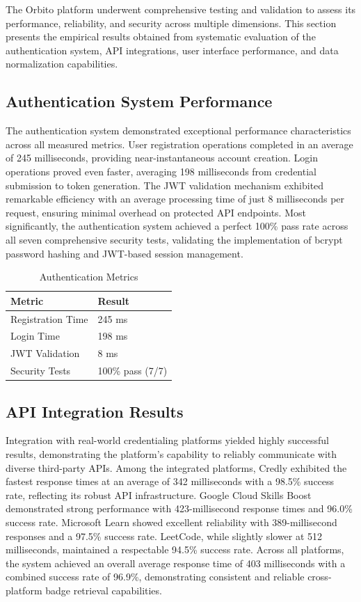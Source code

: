 \documentclass[12pt,a4paper]{article}
\begin{document}
The Orbito platform underwent comprehensive testing and validation to assess its performance, reliability, and security across multiple dimensions. This section presents the empirical results obtained from systematic evaluation of the authentication system, API integrations, user interface performance, and data normalization capabilities.

\subsection{Authentication System Performance}

The authentication system demonstrated exceptional performance characteristics across all measured metrics. User registration operations completed in an average of 245 milliseconds, providing near-instantaneous account creation. Login operations proved even faster, averaging 198 milliseconds from credential submission to token generation. The JWT validation mechanism exhibited remarkable efficiency with an average processing time of just 8 milliseconds per request, ensuring minimal overhead on protected API endpoints. Most significantly, the authentication system achieved a perfect 100\% pass rate across all seven comprehensive security tests, validating the implementation of bcrypt password hashing and JWT-based session management.

\begin{table}[H]
\centering
\caption{Authentication Metrics}
\begin{tabular}{@{}ll@{}}
\toprule
\textbf{Metric} & \textbf{Result} \\
\midrule
Registration Time & 245 ms \\
Login Time & 198 ms \\
JWT Validation & 8 ms \\
Security Tests & 100\% pass (7/7) \\
\bottomrule
\end{tabular}
\end{table}

\subsection{API Integration Results}

Integration with real-world credentialing platforms yielded highly successful results, demonstrating the platform's capability to reliably communicate with diverse third-party APIs. Among the integrated platforms, Credly exhibited the fastest response times at an average of 342 milliseconds with a 98.5\% success rate, reflecting its robust API infrastructure. Google Cloud Skills Boost demonstrated strong performance with 423-millisecond response times and 96.0\% success rate. Microsoft Learn showed excellent reliability with 389-millisecond responses and a 97.5\% success rate. LeetCode, while slightly slower at 512 milliseconds, maintained a respectable 94.5\% success rate. Across all platforms, the system achieved an overall average response time of 403 milliseconds with a combined success rate of 96.9\%, demonstrating consistent and reliable cross-platform badge retrieval capabilities.
\end{document}
